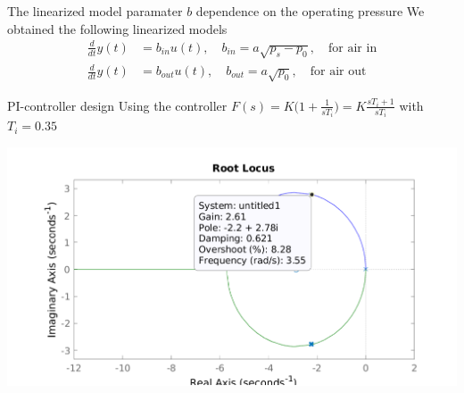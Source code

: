 \documentclass[presentation,aspectratio=169]{beamer}
\begin{document}
\begin{frame}[label={sec:orgbfc8aab}]{The linearized model paramater \(b\) dependence on the operating pressure}
We obtained the following linearized models
\begin{align}
\frac{d}{dt}y(t) &= b_{in}u(t), \quad b_{in} = a\sqrt{p_s-p_0}, \quad \text{for air in}\\
\frac{d}{dt}y(t) &= b_{out}u(t), \quad b_{out} = a\sqrt{p_0}, \quad \text{for air out}
\end{align}

\begin{center}
\end{center}
\end{frame}

\begin{frame}[label={sec:orgdd6eaa8}]{PI-controller design}
Using the controller \(F(s) = K\Big(1 + \frac{1}{sT_i}\Big) = K \frac{s T_i + 1}{sT_i}\)
 with \(T_i = 0.35\)
\begin{center}
\includegraphics[width=0.7\linewidth]{../../figures/rlocus_PI_tank.pdf}
\end{center}
\end{frame}
\end{document}
